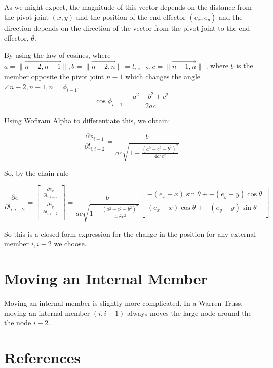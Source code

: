 \documentclass[11pt]{article}
\begin{document}
As we might expect, the magnitude of this vector depends on the distance from the pivot joint $(x,y)$ and the position of the end effector
$(e_x,e_y)$ and the direction depends on the direction of the vector from the pivot joint to the end effector, $\theta$.

By using the law of cosines, where $a = \|\overrightarrow{n-2,n-1}\|, b = \|\overrightarrow{n-2,n}\| = l_{i,i-2}, c = \|\overrightarrow{n-1,n}\| $  ,
where $b$ is the member opposite the pivot joint $n-1$ which changes the angle $\angle n-2,n-1,n = \phi_{i-1}$.
\[
\cos{\phi_{i-1}} = \frac{a^2 - b^2 + c^2}{2 a c}
\]

Using Woflram Alpha to differentiate this, we obtain:

\[
\frac{\partial \phi_{i-1}}{\partial l_{i,i-2}} = \frac{b}{ac\sqrt{1 - \frac{(a^2 + c^2 - b^2)^2}{4a^2c^2}}}
\]

So, by the chain rule

\[
\frac{\partial e}{\partial  l_{i,i-2}} = \begin{bmatrix}
           \frac{\partial e_x}{\partial l_{i,i-2}} \\
           \frac{\partial e_y}{\partial l_{i,i-2}} \\
         \end{bmatrix} = \frac{b}{ac\sqrt{1 - \frac{(a^2 + c^2 - b^2)^2}{4a^2c^2}}} \begin{bmatrix}
           -(e_x  - x) \sin{\theta} + -(e_y -y)\cos{\theta}  \\
           (e_x - x ) \cos{\theta} + -(e_y - y)\sin{\theta}  \\
         \end{bmatrix}
\]

So this is a closed-form expression for the change in the position for any external member $i,i-2$ we choose.


\section{Moving an Internal Member}

Moving an internal member is slightly more complicated. In a Warren Truss, moving an internal member $(i,i-1)$ always
moves the large node around the the node $i-2$.

\section{References}
\end{document}
